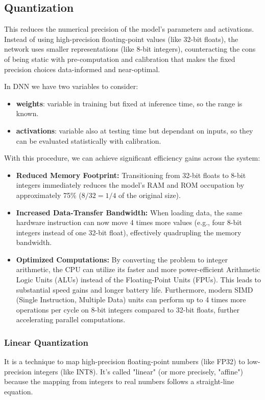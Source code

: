 \subsection{Quantization}
This reduces the numerical precision of the model’s parameters and activations. Instead of using high-precision floating-point values (like 32-bit floats), the network uses smaller representations (like 8-bit integers), counteracting the cons of being static with pre-computation and calibration that makes the fixed precision choices data-informed and near-optimal.

In DNN we have two variables to consider:
\begin{itemize}
    \item \textbf{weights}: variable in training but fixed at inference time, so the range is known.
    \item \textbf{activations}: variable also at testing time but dependant on inputs, so they can be evaluated statistically with calibration.
\end{itemize}

With this procedure, we can achieve significant efficiency gains across the system:

\begin{itemize}
    \item \textbf{Reduced Memory Footprint:} Transitioning from 32-bit floats to 8-bit integers immediately reduces the model's RAM and ROM occupation by approximately 75\% ($8/32 = 1/4$ of the original size).

    \item \textbf{Increased Data-Transfer Bandwidth:} When loading data, the same hardware instruction can now move 4 times more values (e.g., four 8-bit integers instead of one 32-bit float), effectively quadrupling the memory bandwidth.

    \item \textbf{Optimized Computations:} By converting the problem to integer arithmetic, the CPU can utilize its faster and more power-efficient Arithmetic Logic Units (ALUs) instead of the Floating-Point Units (FPUs). This leads to substantial speed gains and longer battery life. Furthermore, modern SIMD (Single Instruction, Multiple Data) units can perform up to 4 times more operations per cycle on 8-bit integers compared to 32-bit floats, further accelerating parallel computations.
\end{itemize}

\subsubsection{Linear Quantization}
It is a technique to map high-precision floating-point numbers (like FP32) to low-precision integers (like INT8). It's called "linear" (or more precisely, "affine") because the mapping from integers to real numbers follows a straight-line equation.

